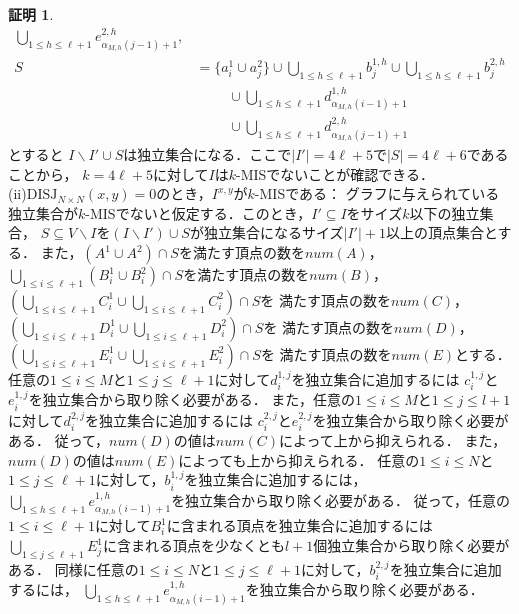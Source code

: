 \documentclass[11pt,a4paper]{jarticle}
\theoremstyle{definition}
\newtheorem*{prf*}{証明}
\begin{document}
\begin{prf*}
\begin{align*}
\bigcup_{1\leq h \leq \ell+1}e^{2,h}_{\alpha_{M,h}(j-1)+1}, \\
S &= \{a^{1}_{i} \cup a^{2}_{j}\} \cup 
\bigcup_{1\leq h \leq \ell+1}b^{1,h}_{j} \cup 
\bigcup_{1\leq h \leq \ell+1}b^{2,h}_{j} \\
&\phantom{=} \quad \cup 
\bigcup_{1\leq h \leq \ell+1}d^{1,h}_{\alpha_{M,h}(i-1)+1} \\
&\phantom{=} \quad \cup 
\bigcup_{1\leq h \leq \ell+1}d^{2,h}_{\alpha_{M,h}(j-1)+1}
\end{align*}
とすると
$I \backslash I' \cup S$は独立集合になる．ここで$|I'|=4\ell+5$で$|S|=4\ell+6$であることから，
$k=4\ell+5$に対して$I$は$k$-MISでないことが確認できる． \\
(ii)$\mathrm{DISJ}_{N \times N} (x, y) = 0$のとき，$I^{x,y}$が$k$-MISである：
グラフに与えられている独立集合が$k$-MISでないと仮定する．このとき，$I'\subseteq I$をサイズ$k$以下の独立集合，
$S\subseteq V\backslash I$を$(I \backslash I') \cup S$が独立集合になるサイズ$|I'|+1$以上の頂点集合とする．
また，$(A^{1}\cup A^{2}) \cap S$を満たす頂点の数を$\mathit{num}(A)$，
$\bigcup_{1\leq i \leq \ell+1}(B_{i}^{1} \cup B_{i}^{2}) \cap S$を満たす頂点の数を$\mathit{num}(B)$，
$\left(\bigcup_{1\leq i \leq \ell+1}C_{i}^{1} \cup \bigcup_{1\leq i \leq \ell+1}C_{i}^{2}\right) \cap S$を
満たす頂点の数を$\mathit{num}(C)$，
$\left(\bigcup_{1\leq i \leq \ell+1}D_{i}^{1} \cup \bigcup_{1\leq i \leq \ell+1}D_{i}^{2}\right) \cap S$を
満たす頂点の数を$\mathit{num}(D)$，
$\left(\bigcup_{1\leq i \leq \ell+1}E_{i}^{1} \cup \bigcup_{1\leq i \leq \ell+1}E_{i}^{2}\right) \cap S$を
満たす頂点の数を$\mathit{num}(E)$とする．
任意の$1\leq i \leq M$と$1\leq j \leq \ell+1$に対して$d^{1,j}_{i}$を独立集合に追加するには
$c^{1,j}_{i}$と$e^{1,j}_{i}$を独立集合から取り除く必要がある．
また，任意の$1\leq i \leq M$と$1\leq j \leq l+1$に対して$d^{2,j}_{i}$を独立集合に追加するには
$c^{2,j}_{i}$と$e^{2,j}_{i}$を独立集合から取り除く必要がある．
従って，$\mathit{num}(D)$の値は$\mathit{num}(C)$によって上から抑えられる．
また，$\mathit{num}(D)$の値は$\mathit{num}(E)$によっても上から抑えられる．
任意の$1\leq i \leq N$と$1\leq j \leq \ell+1$に対して，$b^{1,j}_{i}$を独立集合に追加するには，
$\bigcup_{1\leq h \leq \ell+1} e^{1,h}_{\alpha_{M,h}(i-1)+1}$を独立集合から取り除く必要がある．
従って，任意の$1\leq i \leq \ell+1$に対して$B^{1}_{i}$に含まれる頂点を独立集合に追加するには
$\bigcup_{1\leq j \leq \ell+1}E^{1}_{j}$に含まれる頂点を少なくとも$l+1$個独立集合から取り除く必要がある．
同様に任意の$1\leq i \leq N$と$1\leq j \leq \ell+1$に対して，$b^{2,j}_{i}$を独立集合に追加するには，
$\bigcup_{1\leq h \leq \ell+1} e^{1,h}_{\alpha_{M,h}(i-1)+1}$を独立集合から取り除く必要がある．

\end{prf*}
\end{document}
